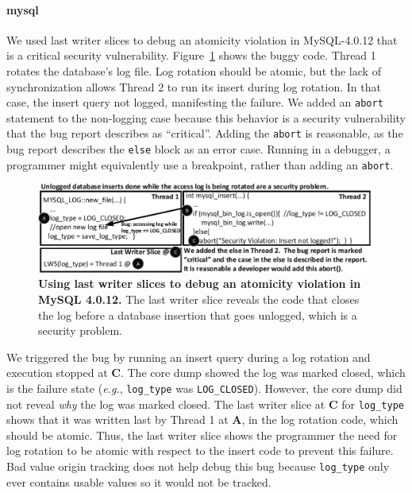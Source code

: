 \documentclass[preprint,9pt]{sigplanconf}
\begin{document}
\paragraph{mysql}

We used last writer slices to debug an atomicity violation in MySQL-4.0.12 that
is a critical security vulnerability.  Figure~\ref{fig:mysqllws} shows the
buggy code.  Thread 1 rotates the database's log file.  Log rotation should be
atomic, but the lack of synchronization allows Thread 2 to run its insert
during log rotation.  In that case, the insert query not logged, manifesting
the failure.  We added an {\tt abort} statement to the non-logging case because
this behavior is a security vulnerability that the bug report describes as
``critical''.  Adding the {\tt abort} is reasonable, as the bug report
describes the {\tt else} block as an error case.  Running in a debugger, a
programmer might equivalently use a breakpoint, rather than adding an
{\tt abort}.


\begin{figure}[h]
\centering
\includegraphics[width=\columnwidth]{figs/MySQLDebug.pdf}
\caption{\label{fig:mysqllws}{\bf Using last writer slices to debug an
atomicity violation in MySQL 4.0.12.} The last writer slice reveals the code that closes the log before a database insertion that goes unlogged, which is a security problem.}
\end{figure}

We triggered the bug by running an insert query during a log rotation and
execution stopped at {\bf C}.  The core dump showed the log was marked closed,
which is the failure state ({\em e.g.}, {\tt log\_type} was {\tt LOG\_CLOSED}).
However, the core dump did not reveal {\em why} the log was marked closed.  The
last writer slice at {\bf C} for {\tt log\_type} shows that it was written last
by Thread 1 at {\bf A}, in the log rotation code, which should be atomic.
Thus, the last writer slice shows the programmer the need for log rotation to
be atomic with respect to the insert code to prevent this failure.  Bad value
origin tracking does not help debug this bug because {\tt log\_type} only ever
contains usable values so it would not be tracked.  
\end{document}
